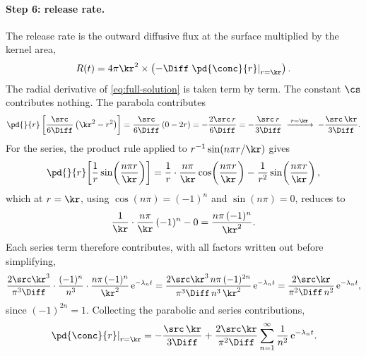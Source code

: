 \paragraph{Step 6: release rate.}
The release rate is the outward diffusive flux at the surface multiplied by the
kernel area,
%
\begin{equation}
  R(t) = 4\pi \kr^{2} \times
  \left( -\Diff \left. \pd{\conc}{r} \right|_{r=\kr} \right) .
  \label{eq:release-def}
\end{equation}
%
The radial derivative of \cref{eq:full-solution} is taken term by term. The constant
$\cs$ contributes nothing. The parabola contributes
%
\begin{equation}
  \pd{}{r}\left[ \frac{\src}{6\Diff}\left( \kr^{2} - r^{2} \right) \right]
  = \frac{\src}{6\Diff}\left( 0 - 2r \right)
  = -\frac{2\src\, r}{6\Diff}
  = -\frac{\src\, r}{3\Diff}
  \;\xrightarrow{\;r=\kr\;}\;
  -\frac{\src\, \kr}{3\Diff} .
\end{equation}
%
For the series, the product rule applied to $r^{-1}\sin(n\pi r/\kr)$ gives
%
\begin{equation}
  \pd{}{r}\!\left[ \frac{1}{r}\sin\!\left( \frac{n\pi r}{\kr} \right) \right]
  = \frac{1}{r}\cdot\frac{n\pi}{\kr}\cos\!\left( \frac{n\pi r}{\kr} \right)
  - \frac{1}{r^{2}}\sin\!\left( \frac{n\pi r}{\kr} \right) ,
\end{equation}
%
which at $r = \kr$, using $\cos(n\pi) = (-1)^{n}$ and $\sin(n\pi) = 0$, reduces to
%
\begin{equation}
  \frac{1}{\kr}\cdot\frac{n\pi}{\kr}\,(-1)^{n} - 0
  = \frac{n\pi\,(-1)^{n}}{\kr^{2}} .
\end{equation}
%
Each series term therefore contributes, with all factors written out before
simplifying,
%
\begin{equation}
  \frac{2 \src \kr^{3}}{\pi^{3} \Diff} \cdot \frac{(-1)^{n}}{n^{3}}
  \cdot \frac{n\pi\,(-1)^{n}}{\kr^{2}}\,
  \mathrm{e}^{-\lambda_{n} t}
  = \frac{2 \src \kr^{3}\, n\pi\,(-1)^{2n}}{\pi^{3} \Diff\, n^{3}\, \kr^{2}}\,
  \mathrm{e}^{-\lambda_{n} t}
  = \frac{2 \src \kr}{\pi^{2} \Diff\, n^{2}}\,
  \mathrm{e}^{-\lambda_{n} t} ,
\end{equation}
%
since $(-1)^{2n} = 1$. Collecting the parabolic and series contributions,
%
\begin{equation}
  \left. \pd{\conc}{r} \right|_{r=\kr}
  = -\frac{\src\, \kr}{3\Diff}
  + \frac{2 \src \kr}{\pi^{2} \Diff} \sum_{n=1}^{\infty}
  \frac{1}{n^{2}}\, \mathrm{e}^{-\lambda_{n} t} .
\end{equation}

